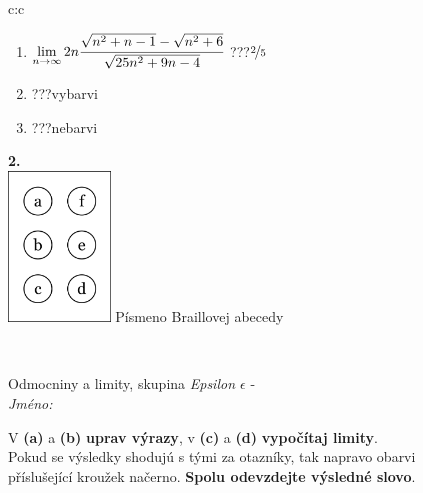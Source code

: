 \documentclass[10pt]{report}
\begin{document}
\begin{tabular}{c:c}
\begin{minipage}[c][104.5mm][t]{0.5\linewidth}
\begin{center}
\begin{minipage}{0.79\linewidth}
\begin{center}
\begin{varwidth}{\linewidth}
\begin{enumerate}
\item $\lim\limits_{n\to\infty}2n\cfrac{\sqrt{n^2+n-1}-\sqrt{n^2+6}}{\sqrt{25n^2+9n-4}}$\quad \dotfill\; ???\;\dotfill \quad $\nicefrac{2}{5}$
\item \quad \dotfill\; ???\;\dotfill \quad vybarvi
\item \quad \dotfill\; ???\;\dotfill \quad nebarvi
\end{enumerate}
\end{varwidth}
\end{center}
\end{minipage}
\begin{minipage}{0.20\linewidth}
\begin{center}
{\Huge\bfseries 2.} \\[2mm]
\includegraphics[height=40mm]{../images/braille.png}
{\small Písmeno Braillovej abecedy}
\end{center}
\end{minipage}
\end{center}
\end{minipage}
\\ \hdashline
\begin{minipage}[c][104.5mm][t]{0.5\linewidth}
\begin{center}
\vspace{7mm}
{\huge Odmocniny a limity, skupina \textit{Epsilon $\epsilon$} -}\\[5mm]
\textit{Jméno:}\phantom{xxxxxxxxxxxxxxxxxxxxxxxxxxxxxxxxxxxxxxxxxxxxxxxxxxxxxxxxxxxxxxxxx}\\[5mm]
\begin{minipage}{0.95\linewidth}
\begin{center}
V \textbf{(a)} a \textbf{(b)} \textbf{uprav výrazy}, v \textbf{(c)} a \textbf{(d)} \textbf{vypočítaj limity}.\\Pokud se výsledky shodujú s tými za otazníky, tak napravo obarvi\\příslušející kroužek načerno. \textbf{Spolu odevzdejte výsledné slovo}.
\end{center}
\end{minipage}
\\[1mm]

\end{center}
\end{minipage}
\end{tabular}
\end{document}
